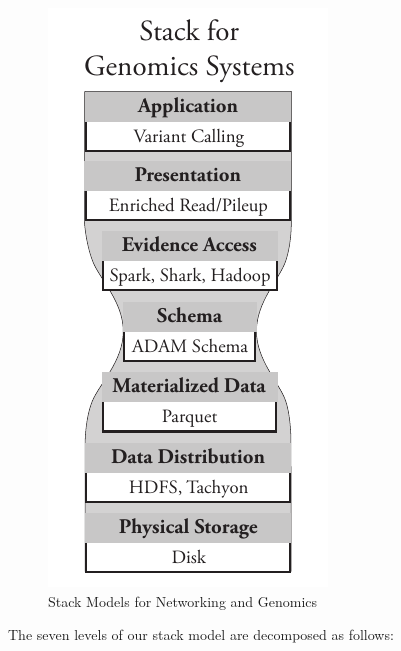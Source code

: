\documentclass[10pt,twocolumn]{article}
\theoremstyle{plain}
\begin{document}
\begin{figure}[h]
\begin{center}
\includegraphics[width=0.6\linewidth]{stack-model.pdf}
\end{center}
\caption{Stack Models for Networking and Genomics}
\label{fig:stack-model}
\end{figure}

The seven levels of our stack model are decomposed as follows:
\end{document}
